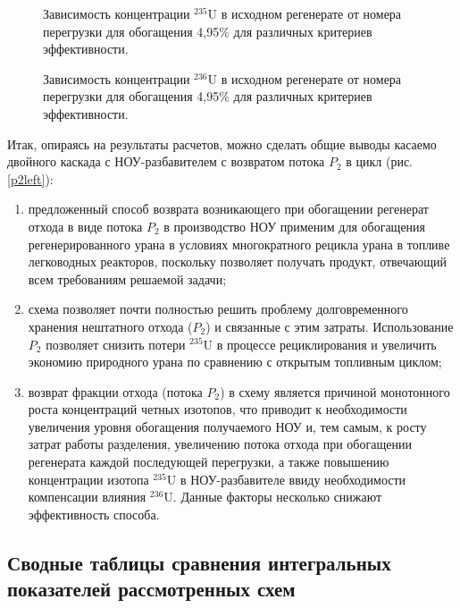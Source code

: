 \begin{figure}[ht]
    \centering
    \begin{minipage}{.5\textwidth}
      \centering
      
      \caption{{Зависимость концентрации $^{235}$U в исходном регенерате от номера перегрузки для обогащения 4,95\% для различных критериев эффективности.{\label{10}}}}
    \end{minipage}%
    \begin{minipage}{.5\textwidth}
      \centering
      
\caption{{Зависимость концентрации $^{236}$U в исходном регенерате от номера перегрузки для обогащения 4,95\% для различных критериев эффективности.{\label{11}}}}
\end{minipage}
\end{figure}


Итак, опираясь на результаты расчетов, можно сделать общие выводы касаемо двойного каскада с НОУ-разбавителем с возвратом потока $P_2$ в цикл (рис. \ref{p2left}):

\begin{enumerate}
    \item предложенный способ возврата возникающего при обогащении регенерат отхода в виде потока $P_2$ в производство НОУ применим для обогащения регенерированного урана в условиях многократного рецикла урана в топливе легководных реакторов, поскольку позволяет получать продукт, отвечающий всем требованиям решаемой задачи;
    \item схема позволяет почти полностью решить проблему долговременного хранения нештатного отхода ($P_2$) и связанные с этим затраты. Использование $P_2$ позволяет снизить потери $^{235}$U в процессе рециклирования и увеличить экономию природного урана по сравнению с открытым топливным циклом;
     \item возврат фракции отхода (потока $P_2$) в схему является причиной монотонного роста концентраций четных изотопов, что приводит к необходимости увеличения уровня обогащения получаемого НОУ и, тем самым, к росту затрат работы разделения, увеличению потока отхода при обогащении регенерата каждой последующей перегрузки, а также повышению концентрации изотопа $^{235}$U в НОУ-разбавителе ввиду необходимости компенсации влияния $^{236}$U. Данные факторы несколько снижают эффективность способа.
\end{enumerate}

\subsection{Сводные таблицы сравнения интегральных показателей рассмотренных схем}


